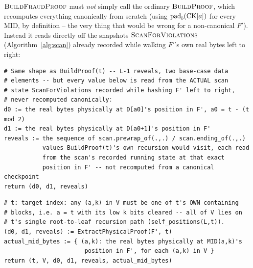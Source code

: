 $\textsc{BuildFraudProof}$ must \emph{not} simply call the ordinary
$\textsc{BuildProof}$, which recomputes everything canonically from
scratch (using $\mathrm{pad}_b(\mathrm{CK}[a])$ for every $\mathrm{MID}$, by
definition -- the very thing that would be wrong for a non-canonical
$F'$). Instead it reads directly off the snapshots
$\textsc{ScanForViolations}$ (Algorithm~\ref{alg:scan}) already recorded
while walking $F'$'s own real bytes left to right:

\begin{algorithm}[H]
\caption{$\textsc{ExtractPhysicalProof}(F', t)$ -- reads BuildProof-shaped values off a real, possibly non-canonical hash trace}
\begin{lstlisting}[style=pseudo]
# Same shape as BuildProof(t) -- L-1 reveals, two base-case data
# elements -- but every value below is read from the ACTUAL scan
# state ScanForViolations recorded while hashing F' left to right,
# never recomputed canonically:
d0 := the real bytes physically at D[a0]'s position in F', a0 = t - (t mod 2)
d1 := the real bytes physically at D[a0+1]'s position in F'
reveals := the sequence of scan.prewrap_of(.,.) / scan.ending_of(.,.)
           values BuildProof(t)'s own recursion would visit, each read
           from the scan's recorded running state at that exact
           position in F' -- not recomputed from a canonical checkpoint
return (d0, d1, reveals)
\end{lstlisting}
\end{algorithm}

\begin{algorithm}[H]
\caption{$\textsc{BuildFraudProof}(F', t, V)$ -- watcher, $O(\log N)$, for known violations $V$ on target $t$'s path}
\label{alg:build-fraud}
\begin{lstlisting}[style=pseudo]
# t: target index: any (a,k) in V must be one of t's OWN containing
# blocks, i.e. a = t with its low k bits cleared -- all of V lies on
# t's single root-to-leaf recursion path (self_positions(L,t)).
(d0, d1, reveals) := ExtractPhysicalProof(F', t)
actual_mid_bytes := { (a,k): the real bytes physically at MID(a,k)'s
                       position in F', for each (a,k) in V }
return (t, V, d0, d1, reveals, actual_mid_bytes)
\end{lstlisting}
\end{algorithm}

